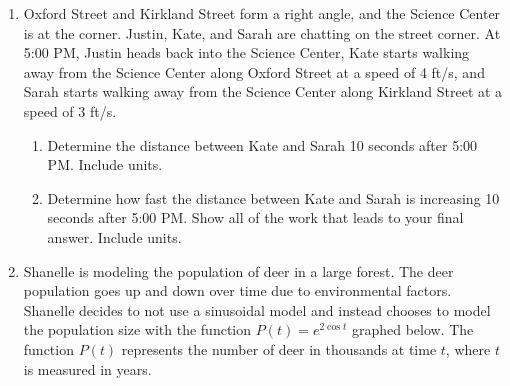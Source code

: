 \documentclass{article}
\begin{document}
\begin{enumerate}
\pspace{\newpage}

\item
Oxford Street and Kirkland Street form a right angle, and the Science Center is at the corner. Justin, Kate, and Sarah are chatting on the street corner. At 5:00 PM, Justin heads back into the Science Center, Kate starts walking away from the Science Center along Oxford Street at a speed of 4 ft/s, and Sarah starts walking away from the Science Center along Kirkland Street at a speed of 3 ft/s.




\begin{enumerate}[topsep=0pt]
    \item Determine the distance between Kate and Sarah 10 seconds after 5:00 PM. Include units.

    \item Determine how fast the distance between Kate and Sarah is increasing 10 seconds after 5:00 PM. Show all of the work that leads to your final answer. Include units.
    
\end{enumerate}

\pspace{\newpage}

\item
Shanelle is modeling the population of deer in a large forest. The deer population goes up and down over time due to environmental factors. Shanelle decides to not use a sinusoidal model and instead chooses to model the population size with the function $P(t)=e^{2\cos t}$ graphed below. The function $P(t)$ represents the number of deer in thousands at time $t$, where $t$ is measured in years. 


\end{enumerate}
\end{document}
